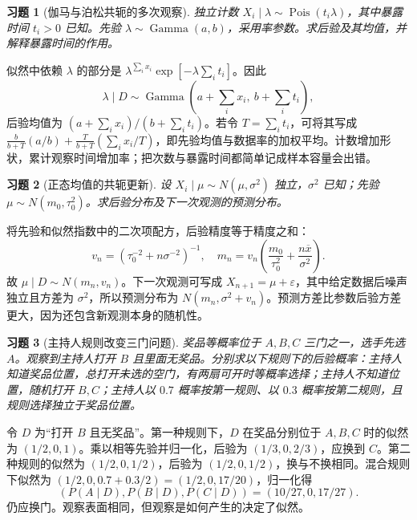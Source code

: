 \documentclass[UTF8,12pt,a4paper,fontset=fandol]{ctexart}
\newtheorem{exercise}{习题}[section]
\begin{document}
\begin{exercise}[伽马与泊松共轭的多次观察]\label{q:B12.2}
独立计数 $X_i\mid\lambda\sim\operatorname{Pois}(t_i\lambda)$，其中暴露时间 $t_i>0$ 已知。先验 $\lambda\sim\operatorname{Gamma}(a,b)$，采用率参数。求后验及其均值，并解释暴露时间的作用。\par{}
\end{exercise}

\begin{solve}\label{a:B12.2}似然中依赖 $\lambda$ 的部分是 $\lambda^{\sum_i x_i}\exp[-\lambda\sum_i t_i]$。因此\[\lambda\mid D\sim\operatorname{Gamma}\left(a+\sum_i x_i,\ b+\sum_i t_i\right),\]后验均值为 $(a+\sum_i x_i)/(b+\sum_i t_i)$。若令 $T=\sum_i t_i$，可将其写成 $\frac{b}{b+T}(a/b)+\frac{T}{b+T}(\sum_i x_i/T)$，即先验均值与数据率的加权平均。计数增加形状，累计观察时间增加率；把次数与暴露时间都简单记成样本容量会出错。\end{solve}

\begin{exercise}[正态均值的共轭更新]\label{q:B12.3}
设 $X_i\mid\mu\sim N(\mu,\sigma^2)$ 独立，$\sigma^2$ 已知；先验 $\mu\sim N(m_0,\tau_0^2)$。求后验分布及下一次观测的预测分布。\par{}
\end{exercise}

\begin{solve}\label{a:B12.3}将先验和似然指数中的二次项配方，后验精度等于精度之和：\[v_n=\left(\tau_0^{-2}+n\sigma^{-2}\right)^{-1},\quad m_n=v_n\left(\frac{m_0}{\tau_0^2}+\frac{n\overline x}{\sigma^2}\right).\]故 $\mu\mid D\sim N(m_n,v_n)$。下一次观测可写成 $X_{n+1}=\mu+\varepsilon$，其中给定数据后噪声独立且方差为 $\sigma^2$，所以预测分布为 $N(m_n,\sigma^2+v_n)$。预测方差比参数后验方差更大，因为还包含新观测本身的随机性。\end{solve}

\begin{exercise}[主持人规则改变三门问题]\label{q:M-P7-1}
奖品等概率位于 $A,B,C$ 三门之一，选手先选 $A$。观察到主持人打开 $B$ 且里面无奖品。分别求以下规则下的后验概率：主持人知道奖品位置，总打开未选的空门，有两扇可开时等概率选择；主持人不知道位置，随机打开 $B,C$；主持人以 $0.7$ 概率按第一规则、以 $0.3$ 概率按第二规则，且规则选择独立于奖品位置。\par{}
\end{exercise}

\begin{solve}\label{a:M-P7-1}令 $D$ 为“打开 $B$ 且无奖品”。第一种规则下，$D$ 在奖品分别位于 $A,B,C$ 时的似然为 $(1/2,0,1)$。乘以相等先验并归一化，后验为 $(1/3,0,2/3)$，应换到 $C$。第二种规则的似然为 $(1/2,0,1/2)$，后验为 $(1/2,0,1/2)$，换与不换相同。混合规则下似然为 $(1/2,0,0.7+0.3/2)=(1/2,0,17/20)$，归一化得\[(P(A\mid D),P(B\mid D),P(C\mid D))=(10/27,0,17/27).\]仍应换门。观察表面相同，但观察是如何产生的决定了似然。\end{solve}
\end{document}
